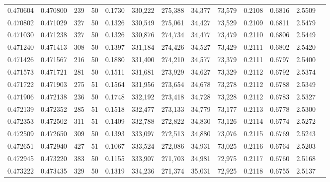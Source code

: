 \begin{tabular}{rrrrrrrrrrrrr}
0.470604 & 0.470800 &   239 &  50 &                                     0.1730 & 330,222 & 275,388 &  34,377 &  73,579 & 0.2108 & 0.6816 & 2.5509 \\
0.470802 & 0.471029 &   327 &  50 &                                     0.1326 & 330,549 & 275,061 &  34,427 &  73,529 & 0.2109 & 0.6811 & 2.5479 \\
0.471030 & 0.471238 &   327 &  50 &                                     0.1326 & 330,876 & 274,734 &  34,477 &  73,479 & 0.2110 & 0.6806 & 2.5449 \\
0.471240 & 0.471413 &   308 &  50 &                                     0.1397 & 331,184 & 274,426 &  34,527 &  73,429 & 0.2111 & 0.6802 & 2.5420 \\
0.471426 & 0.471567 &   216 &  50 &                                     0.1880 & 331,400 & 274,210 &  34,577 &  73,379 & 0.2111 & 0.6797 & 2.5400 \\
0.471573 & 0.471721 &   281 &  50 &                                     0.1511 & 331,681 & 273,929 &  34,627 &  73,329 & 0.2112 & 0.6792 & 2.5374 \\
0.471722 & 0.471903 &   275 &  51 &                                     0.1564 & 331,956 & 273,654 &  34,678 &  73,278 & 0.2112 & 0.6788 & 2.5349 \\
0.471906 & 0.472138 &   236 &  50 &                                     0.1748 & 332,192 & 273,418 &  34,728 &  73,228 & 0.2112 & 0.6783 & 2.5327 \\
0.472139 & 0.472352 &   285 &  51 &                                     0.1518 & 332,477 & 273,133 &  34,779 &  73,177 & 0.2113 & 0.6778 & 2.5300 \\
0.472353 & 0.472502 &   311 &  51 &                                     0.1409 & 332,788 & 272,822 &  34,830 &  73,126 & 0.2114 & 0.6774 & 2.5272 \\
0.472509 & 0.472650 &   309 &  50 &                                     0.1393 & 333,097 & 272,513 &  34,880 &  73,076 & 0.2115 & 0.6769 & 2.5243 \\
0.472651 & 0.472940 &   427 &  51 &                                     0.1067 & 333,524 & 272,086 &  34,931 &  73,025 & 0.2116 & 0.6764 & 2.5203 \\
0.472945 & 0.473220 &   383 &  50 &                                     0.1155 & 333,907 & 271,703 &  34,981 &  72,975 & 0.2117 & 0.6760 & 2.5168 \\
0.473222 & 0.473435 &   329 &  50 &                                     0.1319 & 334,236 & 271,374 &  35,031 &  72,925 & 0.2118 & 0.6755 & 2.5137 \\

\end{tabular}
